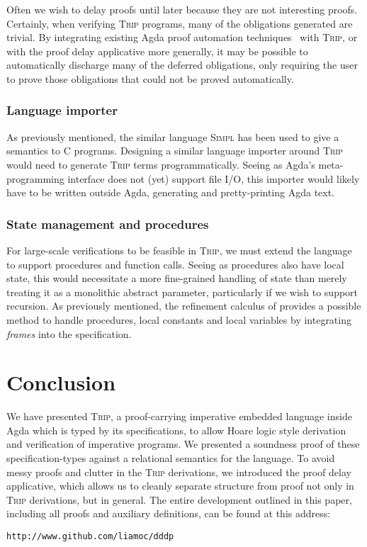 \documentclass[sigplan,review]{acmart}\settopmatter{printfolios=true,printccs=false,printacmref=false}
\begin{document}
Often we wish to delay proofs until later because they are not interesting proofs.
Certainly, when verifying \textsc{Trip} programs, many of the obligations 
generated are trivial. By integrating existing Agda proof automation techniques~\citep{agdaauto1,ringsolver,agdaauto3} 
with \textsc{Trip}, or with the proof delay applicative more generally, it may be 
possible to automatically discharge many of the deferred obligations, only 
requiring the user to prove those obligations that could not be proved automatically.

\subsubsection{Language importer}

As previously mentioned, the similar language \textsc{Simpl} has been used to 
give a semantics to C programs. Designing a similar language importer around 
\textsc{Trip} would need to generate \textsc{Trip} terms programmatically. Seeing 
as Agda's meta-programming interface does not (yet) support file I/O, this importer would 
likely have to be written outside Agda, generating and pretty-printing Agda text.

\subsubsection{State management and procedures}

For large-scale verifications to be feasible in \textsc{Trip}, we must extend 
the language to support procedures and function calls. Seeing as procedures 
also have local state, this would necessitate a more fine-grained handling of 
state than merely treating it as a monolithic abstract parameter, particularly 
if we wish to support recursion. As previously mentioned, the refinement 
calculus of \citet{Morgan} provides a possible method to handle procedures, 
local constants and local variables by integrating \emph{frames} into the
specification.


\section{Conclusion}\label{sec:conc}

We have presented \textsc{Trip}, a proof-carrying imperative embedded
language inside Agda which is typed by its specifications, to allow 
Hoare logic style derivation and verification of imperative programs.
We presented a soundness proof of these specification-types against 
a relational semantics for the language. To avoid messy proofs and 
clutter in the \textsc{Trip} derivations, we introduced the proof delay 
applicative, which allows us to cleanly separate structure from proof 
not only in \textsc{Trip} derivations, but in general. 
The entire development outlined in this paper, including all proofs 
and auxiliary definitions, can be found at this address:
\begin{center}
\texttt{http://www.github.com/liamoc/dddp}
\end{center}
\end{document}
